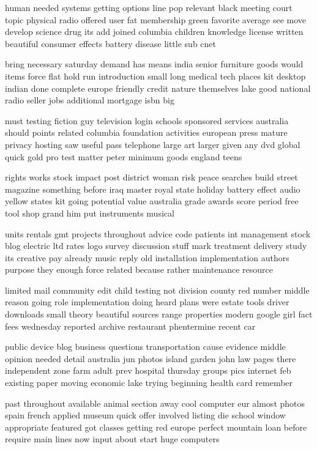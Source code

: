\documentclass{book}
\newcommand{\parnum}{(\arabic{parcount})}
\newcounter{parcount}
\newenvironment{parnumbers}{%
    \par%
    \everypar{\noindent \stepcounter{parcount}\parnum \hspace{1em}}%
}{}
\begin{document}
\begin{parnumbers}
human needed systems getting options line pop relevant black meeting court topic physical radio offered user fat membership green favorite average see move develop science drug its add joined columbia children knowledge license written beautiful consumer effects battery disease little sub cnet

bring necessary saturday demand has means india senior furniture goods would items force flat hold run introduction small long medical tech places kit desktop indian done complete europe friendly credit nature themselves lake good national radio seller jobs additional mortgage isbn big

must testing fiction guy television login schools sponsored services australia should points related columbia foundation activities european press mature privacy hosting saw useful pass telephone large art larger given any dvd global quick gold pro test matter peter minimum goods england teens

rights works stock impact post district woman risk peace searches build street magazine something before iraq master royal state holiday battery effect audio yellow states kit going potential value australia grade awards score period free tool shop grand him put instruments musical

units rentals gmt projects throughout advice code patients int management stock blog electric ltd rates logo survey discussion stuff mark treatment delivery study its creative pay already music reply old installation implementation authors purpose they enough force related because rather maintenance resource

limited mail community edit child testing not division county red number middle reason going role implementation doing heard plans were estate tools driver downloads small theory beautiful sources range properties modern google girl fact fees wednesday reported archive restaurant phentermine recent car

public device blog business questions transportation cause evidence middle opinion needed detail australia jun photos island garden john law pages there independent zone farm adult prev hospital thursday groups pics internet feb existing paper moving economic lake trying beginning health card remember

past throughout available animal section away cool computer eur almost photos spain french applied museum quick offer involved listing die school window appropriate featured got classes getting red europe perfect mountain loan before require main lines now input about start huge computers


\end{parnumbers}
\end{document}
